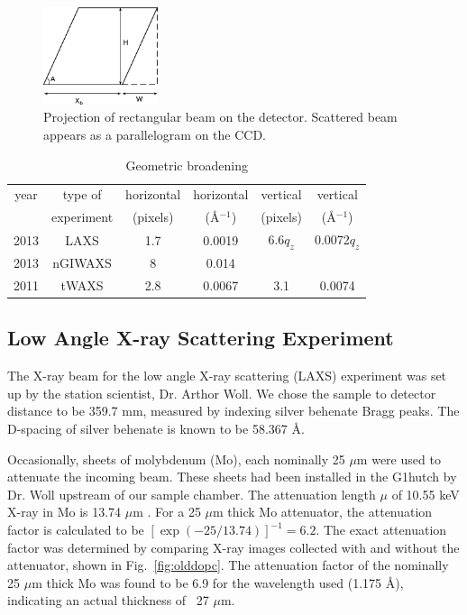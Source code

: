 \begin{figure}[htbp]
  \centering
  \includegraphics[width=0.3\textwidth]{figures/ripple/MMs/transmission/geometric_broadening4}
  \caption{Projection of rectangular beam on the detector. Scattered beam
  appears as a parallelogram on the CCD.}
  \label{fig:gb_trans3}
\end{figure}

\begin{table}[p]
  \centering
  \begin{tabular}{cccccc}
    \hline
    year & type of & horizontal & horizontal & vertical & vertical \\
     & experiment & (pixels) & (\AA$^{-1}$) & (pixels) & (\AA$^{-1}$) \\
    \hline
    2013 & LAXS & 1.7 & 0.0019 & 6.6$q_z$ & 0.0072$q_z$ \\
    2013 & nGIWAXS & 8 & 0.014 &  & \\
    2011 & tWAXS & 2.8 & 0.0067 & 3.1 & 0.0074 \\
    \hline
  \end{tabular}
  \caption{Geometric broadening}
  \label{tab:geometric_broadening}
\end{table}

\newpage
\subsection{Low Angle X-ray Scattering Experiment}\label{sec:LAXS_method}
The X-ray beam for the low angle X-ray scattering (LAXS) experiment 
was set up by the station scientist, Dr. Arthor Woll.
We chose the sample to detector distance to be 359.7 mm, measured by indexing
silver behenate Bragg peaks. The D-spacing of silver behenate is known to be
58.367 \AA.

Occasionally, sheets of molybdenum (Mo), each nominally 25 $\mu$m were 
used to attenuate the incoming beam. 
These sheets had been installed in the G1hutch by Dr. Woll upstream of our 
sample chamber.
The attenuation length $\mu$ of 10.55 keV X-ray in Mo is 13.74 $\mu$m \cite{ref:cxro}.
For a 25 $\mu$m thick Mo attenuator, the attenuation factor is calculated to be
$[\exp(-25/13.74)]^{-1} = 6.2$. The exact attenuation factor was determined
by comparing X-ray images collected with and without the attenuator, 
shown in Fig.~\ref{fig:olddopc}.
The attenuation factor of the nominally 25 $\mu$m thick Mo was found to 
be 6.9 for the wavelength used (1.175 \AA), indicating an actual thickness
of ~27 $\mu$m. 

